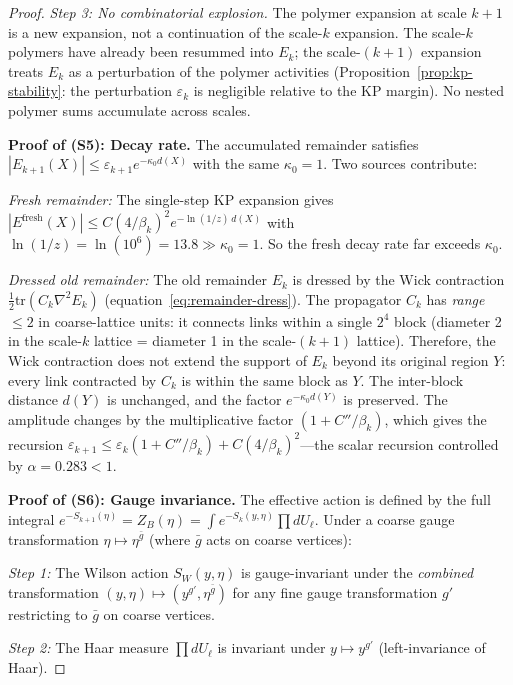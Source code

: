 \documentclass[11pt]{article}
\theoremstyle{definition}
\begin{document}
\begin{proof}
\emph{Step 3: No combinatorial explosion.}
The polymer expansion at scale $k{+}1$ is a new
expansion, not a continuation of the scale-$k$ expansion.
The scale-$k$ polymers have already been resummed into
$E_k$; the scale-$(k{+}1)$ expansion treats $E_k$ as
a perturbation of the polymer activities
(Proposition~\ref{prop:kp-stability}: the perturbation
$\varepsilon_k$ is negligible relative to the KP margin).
No nested polymer sums accumulate across scales.

\medskip\noindent\textbf{Proof of (S5): Decay rate.}
The accumulated remainder satisfies
$|E_{k+1}(X)|\le\varepsilon_{k+1}e^{-\kappa_0 d(X)}$
with the same $\kappa_0=1$.  Two sources contribute:

\emph{Fresh remainder:} The single-step KP expansion gives
$|E^{\mathrm{fresh}}(X)|\le C(4/\beta_k)^2 e^{-\ln(1/z)\,d(X)}$
with $\ln(1/z)=\ln(10^6)=13.8\gg\kappa_0=1$.  So the fresh
decay rate far exceeds $\kappa_0$.

\emph{Dressed old remainder:} The old remainder $E_k$ is dressed
by the Wick contraction $\frac{1}{2}\mathrm{tr}(C_k\nabla^2 E_k)$
(equation~\eqref{eq:remainder-dress}).  The propagator $C_k$
has \emph{range $\le 2$} in coarse-lattice units: it connects
links within a single $2^4$ block (diameter 2 in the
scale-$k$ lattice = diameter 1 in the scale-$(k{+}1)$ lattice).
Therefore, the Wick contraction does not extend the support
of $E_k$ beyond its original region $Y$: every link
contracted by $C_k$ is within the same block as $Y$.
The inter-block distance $d(Y)$ is unchanged, and the
factor $e^{-\kappa_0 d(Y)}$ is preserved.  The amplitude
changes by the multiplicative factor $(1+C''/\beta_k)$,
which gives the recursion $\varepsilon_{k+1}
\le\varepsilon_k(1+C''/\beta_k)+C(4/\beta_k)^2$---the
scalar recursion controlled by $\alpha=0.283<1$.

\medskip\noindent\textbf{Proof of (S6): Gauge invariance.}
The effective action is defined by the full integral
$e^{-S_{k+1}(\eta)}=Z_B(\eta)
=\int e^{-S_k(y,\eta)}\prod dU_\ell$.
Under a coarse gauge transformation
$\eta\mapsto\eta^{\bar g}$ (where $\bar g$ acts on
coarse vertices):

\emph{Step 1:} The Wilson action $S_W(y,\eta)$ is
gauge-invariant under the \emph{combined} transformation
$(y,\eta)\mapsto(y^{g'},\eta^{\bar g})$ for any fine
gauge transformation $g'$ restricting to $\bar g$ on
coarse vertices.

\emph{Step 2:} The Haar measure $\prod dU_\ell$ is
invariant under $y\mapsto y^{g'}$ (left-invariance of Haar).


\end{proof}
\end{document}
